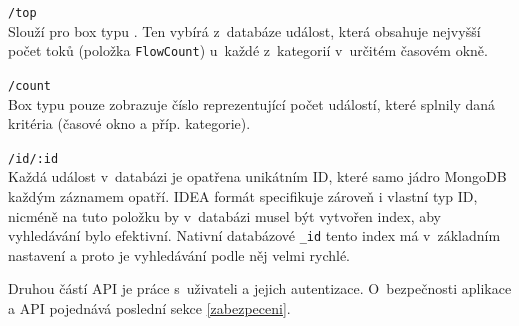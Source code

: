 \begin{description}
    \item \texttt{/top}\\
        Slouží pro box typu . Ten vybírá z~databáze událost, která obsahuje nejvyšší počet toků (položka \texttt{FlowCount}) u~každé z~kategorií v~určitém časovém okně.

    \item \texttt{/count}\\
        Box typu  pouze zobrazuje číslo reprezentující počet událostí, které splnily daná kritéria (časové okno a příp. kategorie).
    
    \item \texttt{/id/:id}\\
        Každá událost v~databázi je opatřena unikátním ID, které samo jádro MongoDB každým záznamem opatří. IDEA formát specifikuje zároveň i vlastní typ ID, nicméně na tuto položku by v~databázi musel být vytvořen index, aby vyhledávání bylo efektivní. Nativní databázové \texttt{\_id} tento index má v~základním nastavení a proto je vyhledávání podle něj velmi rychlé.

\end{description}

Druhou částí API je práce s~uživateli a jejich autentizace. O~bezpečnosti aplikace a API pojednává poslední sekce \ref{zabezpeceni}.

